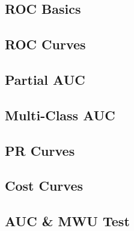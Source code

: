 \subsection{ROC Basics}


\subsection{ROC Curves}


\subsection{Partial AUC}


\subsection{Multi-Class AUC}


\subsection{PR Curves}


\subsection{Cost Curves}


\subsection{AUC \& MWU Test}
